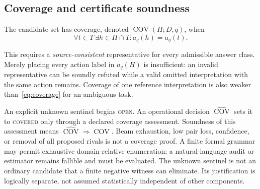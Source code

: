 \subsection{Coverage and certificate soundness}

\begin{definition}
\label{def:coverage}
The candidate set has coverage, denoted $\operatorname{COV}(H;D,q)$, when
\begin{equation}
 \forall t\in T\ \exists h\in H\cap T:
 a_q(h)=a_q(t).
 \label{eq:coverage}
\end{equation}
\end{definition}
This requires a \emph{source-consistent} representative for every admissible
answer class. Merely placing every action label in $a_q(H)$ is insufficient:
an invalid representative can be soundly refuted while a valid omitted
interpretation with the same action remains. Coverage of one reference
interpretation is also weaker than~\eqref{eq:coverage} for an ambiguous task.

An explicit unknown sentinel begins \textsc{open}. An operational decision
$\widehat{\operatorname{COV}}$ sets it to \textsc{covered} only through a declared
coverage assessment. Soundness of this assessment means
$\widehat{\operatorname{COV}}\Rightarrow\operatorname{COV}$. Beam exhaustion,
low pair loss, confidence, or removal of all proposed rivals is not a coverage
proof. A finite formal grammar may permit exhaustive domain-relative
enumeration; a natural-language audit or estimator remains fallible and must
be evaluated. The unknown sentinel is not an ordinary candidate that a finite
negative witness can eliminate. Its justification is logically separate, not
assumed statistically independent of other components.

